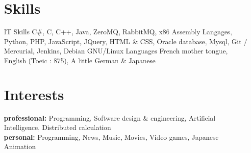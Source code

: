 \documentclass[]{friggeri-cv} %
\begin{document}
\section{Skills}
\begin{entrylist}
\entry
{ }
{IT Skills}
{ }
{ C\#, C, C++, Java, ZeroMQ, RabbitMQ, x86 Assembly Langages, Python, PHP, JavaScript, JQuery, HTML \& CSS, Oracle database, Mysql, Git / Mercurial, Jenkins, Debian GNU/Linux }
\entry
{ }
{Languages}
{ }
{French mother tongue, English (Toeic : 875), A little German \& Japanese}
\end{entrylist}
\section{Interests}

\textbf{professional:} Programming, Software design \& engineering, Artificial Intelligence, Distributed calculation \\
\textbf{personal:} Programming, News, Music, Movies, Video games, Japanese Animation


\end{document}
